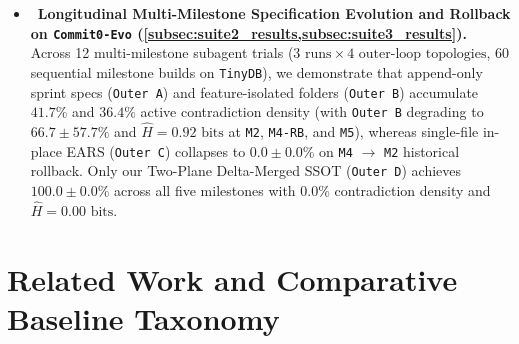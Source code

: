 \documentclass[11pt,a4paper,copyright]{google}
\begin{document}
\begin{itemize}[leftmargin=1.5em,itemsep=2pt,topsep=2pt]
  \item[\ding{175}]~\textbf{Longitudinal Multi-Milestone Specification Evolution and Rollback on \texttt{Commit0-Evo} (\cref{subsec:suite2_results,subsec:suite3_results}).} Across 12 multi-milestone subagent trials ($3\text{ runs} \times 4\text{ outer-loop topologies}$, 60 sequential milestone builds on \texttt{TinyDB}), we demonstrate that append-only sprint specs (\texttt{Outer A}) and feature-isolated folders (\texttt{Outer B}) accumulate $41.7\%$ and $36.4\%$ active contradiction density (with \texttt{Outer B} degrading to $66.7 \pm 57.7\%$ and $\hat{H} = 0.92\text{ bits}$ at \texttt{M2}, \texttt{M4-RB}, and \texttt{M5}), whereas single-file in-place EARS (\texttt{Outer C}) collapses to $0.0 \pm 0.0\%$ on \texttt{M4} $\to$ \texttt{M2} historical rollback. Only our Two-Plane Delta-Merged SSOT (\texttt{Outer D}) achieves $100.0 \pm 0.0\%$ across all five milestones with $0.0\%$ contradiction density and $\hat{H} = 0.00\text{ bits}$.
\end{itemize}


\section{Related Work and Comparative Baseline Taxonomy}
\label{sec:related}
\end{document}
